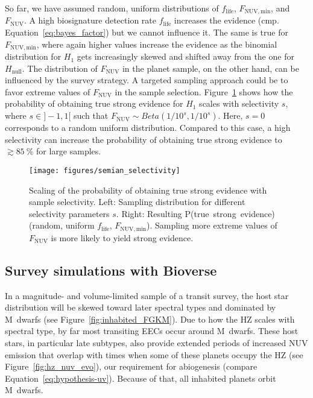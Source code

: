 \documentclass[modern,linenumbers]{aastex631}
\begin{document}
So far, we have assumed random, uniform distributions of $f_\mathrm{life}$, $F_\mathrm{NUV, min}$, and $F_\mathrm{NUV}$.
A high biosignature detection rate $f_\mathrm{life}$ increases the evidence (cmp. Equation~\ref{eq:bayes_factor}) but we cannot influence it.
The same is true for $F_\mathrm{NUV, min}$, where again higher values increase the evidence as the binomial distribution for $H_\mathrm{1}$ gets increasingly skewed and shifted away from the one for $H_\mathrm{null}$.
The distribution of $F_\mathrm{NUV}$ in the planet sample, on the other hand, can be influenced by the survey strategy.
A targeted sampling approach could be to favor extreme values of $F_\mathrm{NUV}$ in the sample selection.
Figure~\ref{fig:semian_selectivity} shows how the probability of obtaining true strong evidence for $H_\mathrm{1}$ scales with selectivity $s$, where $s\in]-1,1[$ such that $F_\mathrm{NUV} \sim Beta(1/10^s,1/10^s)$.
Here, $s=0$ corresponds to a random uniform distribution.
Compared to this case, a high selectivity can increase the probability of obtaining true strong evidence to $\gtrsim \SI{85}{\percent}$ for large samples.

\begin{figure}
    \begin{centering}
        \texttt{[image: figures/semian\_selectivity]}
        \caption{Scaling of the probability of obtaining true strong evidence with sample selectivity. Left: Sampling distribution for different selectivity parameters $s$. Right: Resulting \mbox{P(true strong evidence)} (random, uniform $f_\mathrm{life}$, $F_\mathrm{NUV, min}$). Sampling more extreme values of $F_\mathrm{NUV}$ is more likely to yield strong evidence.}
        \label{fig:semian_selectivity}
    \end{centering}
\end{figure}




\subsection{Survey simulations with Bioverse}

In a magnitude- and volume-limited sample of a transit survey, the host star distribution will be skewed toward later spectral types and dominated by M~dwarfs (see Figure~\ref{fig:inhabited_FGKM}).
Due to how the \gls{HZ} scales with spectral type, by far most transiting \glspl{EEC} occur around M~dwarfs.
These host stars, in particular late subtypes, also provide extended periods of increased \gls{NUV} emission that overlap with times when some of these planets occupy the \gls{HZ} (see Figure~\ref{fig:hz_nuv_evo}), our requirement for abiogenesis (compare Equation~\ref{eq:hypothesis-uv}).
Because of that, all inhabited planets orbit M~dwarfs.
\end{document}
